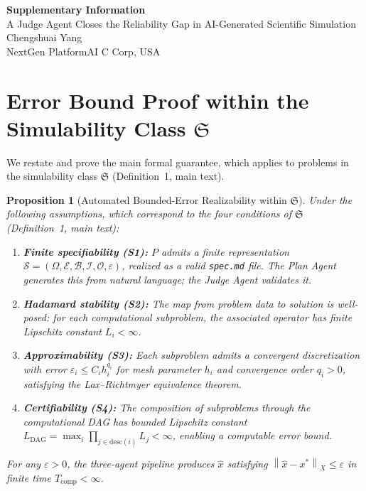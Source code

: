 \documentclass[11pt,a4paper]{article}
\newtheorem{proposition}[theorem]{Proposition}
\newcommand{\Sclass}{\mathfrak{S}}
\newcommand{\norm}[1]{\left\|#1\right\|}
\newcommand{\Spec}{\mathcal{S}}
\newcommand{\Domain}{\Omega}
\begin{document}
\begin{center}
{\Large\bfseries Supplementary Information}\\[12pt]
{\large A Judge Agent Closes the Reliability Gap in AI-Generated Scientific Simulation}\\[8pt]
{\normalsize Chengshuai Yang}\\[4pt]
{\small NextGen PlatformAI C Corp, USA}
\end{center}

\vspace{12pt}
\tableofcontents
\newpage

\section{Error Bound Proof within the Simulability Class $\Sclass$}
\label{sec:s1}

We restate and prove the main formal guarantee, which applies to problems in the simulability class $\Sclass$ (Definition~1, main text).

\begin{proposition}[Automated Bounded-Error Realizability within $\Sclass$]
\label{prop:bound}
Under the following assumptions, which correspond to the four conditions of $\Sclass$ (Definition~1, main text):
\begin{enumerate}[nosep,label=(A\arabic*)]
\item \textbf{Finite specifiability (S1):} $P$ admits a finite representation $\Spec = (\Domain, \mathcal{E}, \mathcal{B}, \mathcal{I}, \mathcal{O}, \varepsilon)$, realized as a valid \texttt{spec.md} file. The Plan Agent generates this from natural language; the Judge Agent validates it.
\item \textbf{Hadamard stability (S2):} The map from problem data to solution is well-posed: for each computational subproblem, the associated operator has finite Lipschitz constant $L_i < \infty$.
\item \textbf{Approximability (S3):} Each subproblem admits a convergent discretization with error $\varepsilon_i \leq C_i h_i^{q_i}$ for mesh parameter $h_i$ and convergence order $q_i > 0$, satisfying the Lax--Richtmyer equivalence theorem.
\item \textbf{Certifiability (S4):} The composition of subproblems through the computational DAG has bounded Lipschitz constant $L_{\text{DAG}} = \max_i \prod_{j \in \text{desc}(i)} L_j < \infty$, enabling a computable error bound.
\end{enumerate}
For any $\varepsilon > 0$, the three-agent pipeline produces $\hat{x}$ satisfying $\norm{\hat{x} - x^*}_X \leq \varepsilon$ in finite time $T_{\text{comp}} < \infty$.
\end{proposition}
\end{document}
